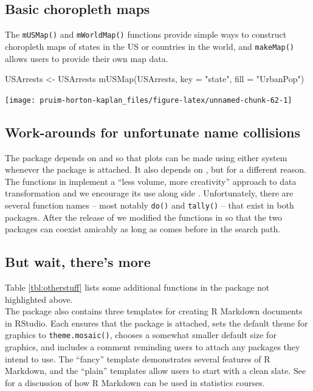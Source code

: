 \subsection{Basic choropleth maps}\label{basic-choropleth-maps}

The \texttt{mUSMap()} and \texttt{mWorldMap()} functions provide simple
ways to construct choropleth maps of states in the US or countries in
the world, and \texttt{makeMap()} allows users to provide their own map
data.

\begin{Schunk}
\begin{Sinput}
USArrests <- USArrests %
mUSMap(USArrests, key = "state", fill = "UrbanPop")
\end{Sinput}


\begin{center}\texttt{[image: pruim-horton-kaplan\_files/figure-latex/unnamed-chunk-62-1]} \end{center}

\end{Schunk}

\subsection{Work-arounds for unfortunate name
collisions}\label{work-arounds-for-unfortunate-name-collisions}

The  package depends on  and  so
that plots can be made using either system whenever the 
package is attached. It also depends on  \citep{dplyr},
but for a different reason. The functions in  implement a
``less volume, more creativity'' approach to data transformation and we
encourage its use along side . Unfortunately, there are
several function names -- most notably \texttt{do()} and
\texttt{tally()} -- that exist in both packages. After the release of
 we modified the functions in  so that the two
packages can coexist amicably as long as  comes before
 in the search path.

\subsection{But wait, there's more}\label{but-wait-theres-more}

Table \ref{tbl:otherstuff} lists some additional functions in the
 package not highlighted above.\\
The package also contains three templates for creating R Markdown
documents in RStudio. Each ensures that the  package is
attached, sets the default theme for  graphics to
\texttt{theme.mosaic()}, chooses a somewhat smaller default size for
graphics, and includes a comment reminding users to attach any packages
they intend to use. The ``fancy'' template demonstrates several features
of R Markdown, and the ``plain'' templates allow users to start with a
clean slate. See \cite{Baumer:RMarkdown:2014} for a discussion of how R
Markdown can be used in statistics courses.

